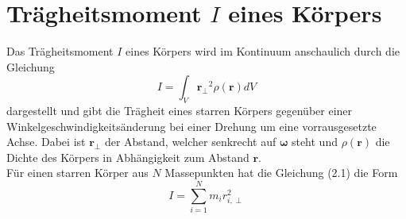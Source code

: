 

\section{Trägheitsmoment $I$ eines Körpers}

Das Trägheitsmoment $I$ eines Körpers wird im Kontinuum anschaulich durch die Gleichung
\begin{equation}
    I = \int_V \mathbf{r_\perp}^2 \rho(\mathbf{r}) dV
\end{equation}
dargestellt und gibt die Trägheit eines starren Körpers gegenüber
einer Winkelgeschwindigkeitsänderung bei einer Drehung um eine vorrausgesetzte Achse. 
Dabei ist $\mathbf{r_\perp}$ der Abstand, welcher senkrecht auf $\mathbf{\omega}$ steht und 
$\rho(\mathbf{r})$ die Dichte des Körpers in Abhängigkeit zum Abstand $\mathbf{r}$.\\
Für einen starren Körper aus $N$ Massepunkten hat die Gleichung (2.1) die Form
\begin{equation}
    I = \sum_{i=1}^{N} m_i r_{i,\perp}^2
\end{equation}
